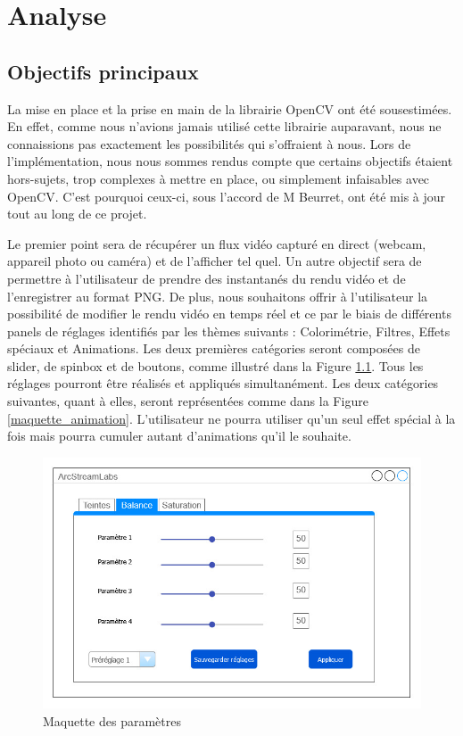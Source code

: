\chapter{Analyse}

\section{Objectifs principaux}

La mise en place et la prise en main de la librairie OpenCV ont été sousestimées.
En effet, comme nous n'avions jamais utilisé cette librairie auparavant, nous ne connaissions pas exactement les possibilités qui s'offraient à nous.
Lors de l'implémentation, nous nous sommes rendus compte que certains objectifs étaient hors-sujets, trop complexes à mettre en place, ou simplement infaisables avec OpenCV.
C'est pourquoi ceux-ci, sous l'accord de M Beurret, ont été mis à jour tout au long de ce projet.


Le premier point sera de récupérer un flux vidéo capturé en direct (webcam, appareil photo ou caméra) et de l'afficher tel quel.
Un autre objectif sera de permettre à l'utilisateur de prendre des instantanés du rendu vidéo et de l'enregistrer au format PNG.
De plus, nous souhaitons offrir à l'utilisateur la possibilité de modifier le rendu vidéo en temps réel et ce par le biais de différents panels de réglages identifiés par les thèmes suivants : Colorimétrie, Filtres, Effets spéciaux et Animations.
Les deux premières catégories seront composées de slider, de spinbox et de boutons, comme illustré dans la Figure \ref{maquette_parametres}. 
Tous les réglages pourront être réalisés et appliqués simultanément.
Les deux catégories suivantes, quant à elles, seront représentées comme dans la Figure \ref{maquette_animation}.
L'utilisateur ne pourra utiliser qu'un seul effet spécial à la fois mais pourra cumuler autant d'animations qu'il le souhaite.

\begin{figure}[h]
  \centering
  \includegraphics[width=\textwidth]{./images/P2_Maquette_Parametres.jpg}
  \caption{Maquette des paramètres}
  \label{maquette_parametres}
\end{figure}

